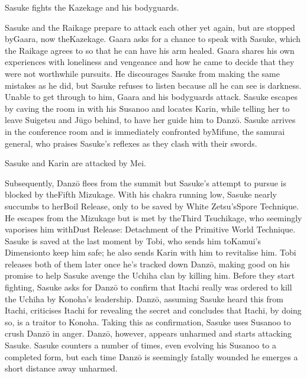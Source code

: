 \documentclass[a4paper,12pt]{article}
\begin{document}
Sasuke fights the Kazekage and his bodyguards.\\ \par \vspace{0.5cm}

Sasuke and the Raikage prepare to attack each other yet again, but are stopped byGaara, now theKazekage. Gaara asks for a chance to speak with Sasuke, which the Raikage agrees to so that he can have his arm healed. Gaara shares his own experiences with loneliness and vengeance and how he came to decide that they were not worthwhile pursuits. He discourages Sasuke from making the same mistakes as he did, but Sasuke refuses to listen because all he can see is darkness. Unable to get through to him, Gaara and his bodyguards attack. Sasuke escapes by caving the room in with his Susanoo and locates Karin, while telling her to leave Suigetsu and Jūgo behind, to have her guide him to Danzō. Sasuke arrives in the conference room and is immediately confronted byMifune, the samurai general, who praises Sasuke's reflexes as they clash with their swords.\\ \par \vspace{0.5cm}

Sasuke and Karin are attacked by Mei.\\ \par \vspace{0.5cm}

Subsequently, Danzō flees from the summit but Sasuke's attempt to pursue is blocked by theFifth Mizukage. With his chakra running low, Sasuke nearly succumbs to herBoil Release, only to be saved by White Zetsu'sSpore Technique. He escapes from the Mizukage but is met by theThird Tsuchikage, who seemingly vaporises him withDust Release: Detachment of the Primitive World Technique. Sasuke is saved at the last moment by Tobi, who sends him toKamui's Dimensionto keep him safe; he also sends Karin with him to revitalise him. Tobi releases both of them later once he's tracked down Danzō, making good on his promise to help Sasuke avenge the Uchiha clan by killing him. Before they start fighting, Sasuke asks for Danzō to confirm that Itachi really was ordered to kill the Uchiha by Konoha's leadership. Danzō, assuming Sasuke heard this from Itachi, criticises Itachi for revealing the secret and concludes that Itachi, by doing so, is a traitor to Konoha. Taking this as confirmation, Sasuke uses Susanoo to crush Danzō in anger. Danzō, however, appears unharmed and starts attacking Sasuke. Sasuke counters a number of times, even evolving his Susanoo to a completed form, but each time Danzō is seemingly fatally wounded he emerges a short distance away unharmed.\\ \par \vspace{0.5cm}
\end{document}
